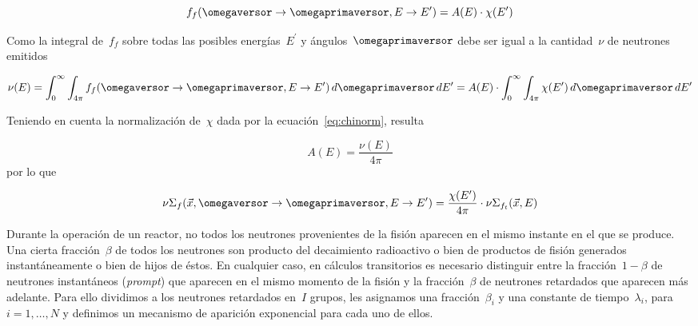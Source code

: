 \begin{equation*}
 f_f(\omegaversor \rightarrow \omegaprimaversor, E \rightarrow E^\prime) = A(E) \cdot \chi(E^\prime)
\end{equation*}

Como la integral de~$f_f$ sobre todas las posibles energías~$E^\prime$ y ángulos~$\omegaprimaversor$ debe ser igual a la cantidad~$\nu$ de neutrones emitidos

\begin{equation*}
 \nu(E) = \int_0^\infty \int_{4\pi} f_f(\omegaversor \rightarrow \omegaprimaversor, E \rightarrow E^\prime) \, d\omegaprimaversor \, dE^\prime =
A(E) \cdot \int_0^\infty \int_{4\pi} \chi(E^\prime) \, d\omegaprimaversor \, dE^\prime
\end{equation*}

Teniendo en cuenta la normalización de~$\chi$ dada por la ecuación~\eqref{eq:chinorm}, resulta

\begin{equation*}
 A(E) = \frac{\nu(E)}{4\pi}
\end{equation*}
%
por lo que

\begin{equation}\label{eq:nusigmaf}
\nu\Sigma_f(\vec{x}, \omegaversor \rightarrow \omegaprimaversor, E \rightarrow E^\prime) = \frac{\chi(E^\prime)}{4\pi} \cdot \nu\Sigma_{f_t}(\vec{x}, E)
\end{equation}

\medskip

Durante la operación de un reactor, no todos los neutrones provenientes de la fisión aparecen en el mismo instante en el que se produce. Una cierta fracción~$\beta$ de todos los neutrones son producto del decaimiento radioactivo o bien de productos de fisión generados instantáneamente o bien de hijos de éstos. En cualquier caso, en cálculos transitorios es necesario distinguir entre la fracción~$1-\beta$ de neutrones instantáneos (\emph{prompt}) que aparecen en el mismo momento de la fisión y la fracción~$\beta$ de neutrones retardados que aparecen más adelante. Para ello dividimos a los neutrones retardados en~$I$ grupos, les asignamos una fracción~$\beta_i$ y una constante de tiempo~$\lambda_i$, para~$i=1,\dots,N$ y definimos un mecanismo de aparición exponencial para cada uno de ellos.

